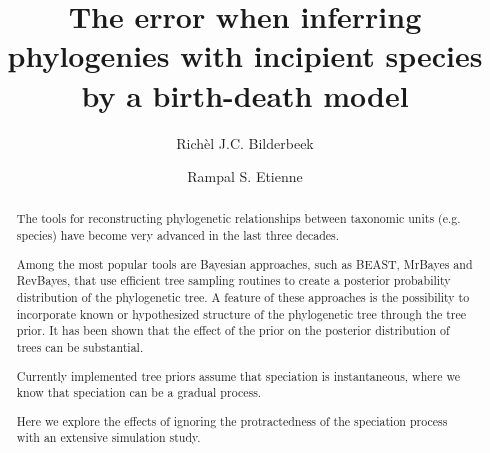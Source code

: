 \documentclass{article}
\title{The error when inferring phylogenies with incipient species by a birth-death model}
\author[1]{Rich\`el J.C. Bilderbeek}
\author[1]{Rampal S. Etienne}
\affil[1]{Groningen Institute for Evolutionary Life Sciences, University of Groningen, Groningen, The Netherlands}
\begin{document}
\maketitle

\begin{abstract}



  The tools for reconstructing phylogenetic relationships between taxonomic 
  units (e.g. species) have become very advanced in the last three decades. 

  Among the most popular tools are Bayesian approaches, such as BEAST, MrBayes and RevBayes, 
  that use efficient tree sampling routines to create a posterior probability distribution 
  of the phylogenetic tree. 
  A feature of these approaches is the possibility to incorporate 
  known or hypothesized structure of the phylogenetic tree through the tree prior. 
  It has been shown that the effect of the prior on the posterior distribution 
  of trees can be substantial. 

  Currently implemented tree priors assume that speciation is instantaneous,
  where we know that speciation can be a gradual process.

  Here we explore the effects of ignoring 
  the protractedness of the speciation process with an extensive simulation study. 






\end{abstract}
\end{document}
